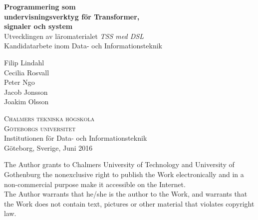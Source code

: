 
\begin{titlepage}

\addtolength{\voffset}{2cm}


\mbox{}
\vfill
\renewcommand{\familydefault}{\sfdefault} \normalfont %
\textbf{{\Huge Programmering som\\ undervisningsverktyg för Transformer,\\signaler och system\\[0.2cm]}}
{\Large Utvecklingen av läromaterialet \textit{TSS med DSL} }\\[0.5cm]
Kandidatarbete inom Data- och Informationsteknik \setlength{\parskip}{1cm}

\begin{flushleft}
  \Large
  Filip Lindahl\\
  Cecilia Rosvall\\
  Peter Ngo\\
  Jacob Jonsson\\
  Joakim Olsson\\
\end{flushleft}


\setlength{\parskip}{2.9cm}

\textsc{Chalmers tekniska högskola} \\
\textsc{Göteborgs universitet} \\
Institutionen för Data- och Informationsteknik \\
Göteborg, Sverige, Juni 2016

\renewcommand{\familydefault}{\rmdefault} \normalfont %
\end{titlepage}

\newpage
\thispagestyle{plain}

The Author grants to Chalmers University of Technology and University
of Gothenburg the nonexclusive right to publish the Work
electronically and in a non-commercial purpose make it accessible on
the Internet. \\
The Author warrants that he/she is the author to the
Work, and warrants that the Work does not contain text, pictures or
other material that violates copyright law.

